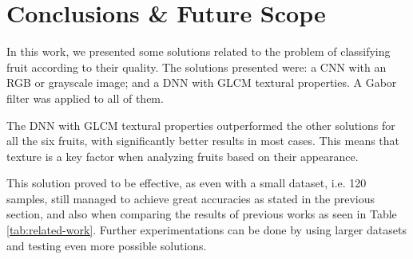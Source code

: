 \documentclass[../main.tex]{subfile}
\begin{document}
\section{Conclusions \& Future Scope} \label{sec:conclusions-&-future-scope}

In this work, we presented some solutions related to the problem of classifying fruit according to their quality. The solutions presented were: a CNN with an RGB or grayscale image; and a DNN with GLCM textural properties. A Gabor filter was applied to all of them.

The DNN with GLCM textural properties outperformed the other solutions for all the six fruits, with significantly better results in most cases. This means that texture is a key factor when analyzing fruits based on their appearance.



This solution proved to be effective, as even with a small dataset, i.e. 120 samples, still managed to achieve great accuracies as stated in the previous section, and also when comparing the results of previous works as seen in Table \ref{tab:related-work}. Further experimentations can be done by using larger datasets and testing even more possible solutions.
\end{document}
